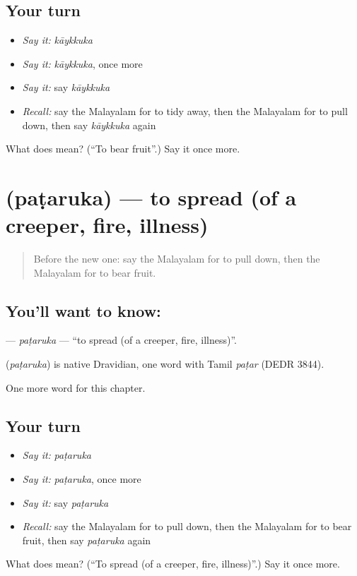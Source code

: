 \subsection*{Your turn}
\begin{itemize}
\raggedright
  \item \emph{Say it:} \emph{kāykkuka}
  \item \emph{Say it:} \emph{kāykkuka}, once more
  \item \emph{Say it:} say \emph{kāykkuka}
  \item \emph{Recall:} say the Malayalam for to tidy away, then the Malayalam for to pull down, then say \emph{kāykkuka} again
\end{itemize}

\begin{tcolorbox}[breakable,colback=teal!4,colframe=teal!35!black,title={Before you move on}]
What does  mean? (\textquotedblleft{}To bear fruit\textquotedblright{}.) Say it once more.
\end{tcolorbox}
\section[\texorpdfstring{\ml{പടരുക} (paṭaruka)}{പടരുക (paṭaruka)}]{ (paṭaruka) — to spread (of a creeper, fire, illness)}

\label{lesson:ML-C311-pataruka}



\begin{quote}
Before the new one: say the Malayalam for to pull down, then the Malayalam for to bear fruit.
\end{quote}

\subsection*{You'll want to know: }
\textbf{} — \emph{paṭaruka} — \textquotedblleft{}to spread (of a creeper, fire, illness)\textquotedblright{}.

\begin{cousinweb}
\textbf{} (\emph{paṭaruka}) is native Dravidian, one word with Tamil \emph{paṭar} (DEDR 3844).
\end{cousinweb}

\begin{grammarlens}[title={What you've built}]
One more word for this chapter.
\end{grammarlens}

\subsection*{Your turn}
\begin{itemize}
\raggedright
  \item \emph{Say it:} \emph{paṭaruka}
  \item \emph{Say it:} \emph{paṭaruka}, once more
  \item \emph{Say it:} say \emph{paṭaruka}
  \item \emph{Recall:} say the Malayalam for to pull down, then the Malayalam for to bear fruit, then say \emph{paṭaruka} again
\end{itemize}

\begin{tcolorbox}[breakable,colback=teal!4,colframe=teal!35!black,title={Before you move on}]
What does  mean? (\textquotedblleft{}To spread (of a creeper, fire, illness)\textquotedblright{}.) Say it once more.
\end{tcolorbox}
